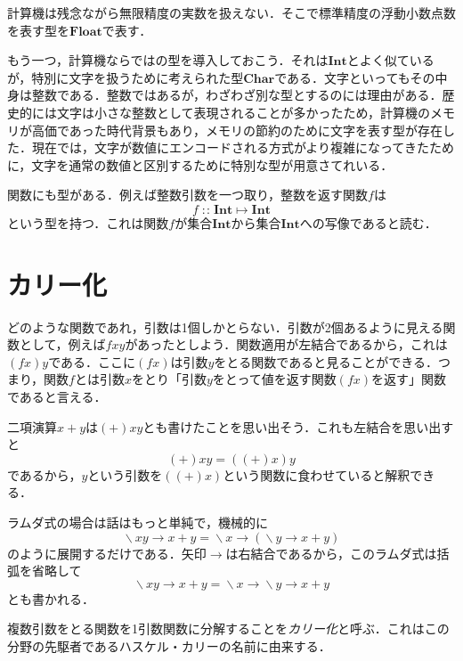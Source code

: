 \documentclass[twocolumn]{jsbook}
\newcommand{\keyword}[1]{{\emph{#1}}}
\newcommand{\hsklType}[1]{\textbf{#1}}
\newcommand{\hsklChar}{\hsklType{Char}}
\newcommand{\hsklInt}{\hsklType{Int}}
\newcommand{\hsklFloat}{\hsklType{Float}}
\DeclareMathOperator{\mathIn}{:\!:}
\DeclareMathOperator{\mathLambda}{\backslash}
\DeclareMathOperator{\mathMapsTo}{\mapsto}
\newcommand{\mathLambdaArrow}{\rightarrow}
\newcommand{\mathLambdaExpression}[2]{\mathLambda#1\mathLambdaArrow#2}
\newcommand{\mathMorph}[2]{#1\mathMapsTo#2}
\begin{document}
計算機は残念ながら無限精度の実数を扱えない．そこで標準精度の浮動小数点数を表す型を$\hsklFloat$で表す．

もう一つ，計算機ならではの型を導入しておこう．それは$\hsklInt$とよく似ているが，特別に文字を扱うために考えられた型$\hsklChar$である．文字といってもその中身は整数である．整数ではあるが，わざわざ別な型とするのには理由がある．歴史的には文字は小さな整数として表現されることが多かったため，計算機のメモリが高価であった時代背景もあり，メモリの節約のために文字を表す型が存在した．現在では，文字が数値にエンコードされる方式がより複雑になってきたために，文字を通常の数値と区別するために特別な型が用意さてれいる．

関数にも型がある．例えば整数引数を一つ取り，整数を返す関数$f$は
\begin{equation*}
f\mathIn\mathMorph{\hsklInt}{\hsklInt}
\end{equation*}
という型を持つ．これは関数$f$が集合$\hsklInt$から集合$\hsklInt$への写像であると読む．

\section{カリー化}

どのような関数であれ，引数は1個しかとらない．引数が2個あるように見える関数として，例えば$fxy$があったとしよう．関数適用が左結合であるから，これは$(fx)y$である．ここに$(fx)$は引数$y$をとる関数であると見ることができる．つまり，関数$f$とは引数$x$をとり「引数$y$をとって値を返す関数$(fx)$を返す」関数であると言える．

二項演算$x+y$は$(+)xy$とも書けたことを思い出そう．これも左結合を思い出すと
\begin{equation}
(+)xy=((+)x)y
\end{equation}
であるから，$y$という引数を$((+)x)$という関数に食わせていると解釈できる．

ラムダ式の場合は話はもっと単純で，機械的に
\begin{equation}
\mathLambdaExpression{xy}{x+y}=\mathLambdaExpression{x}{(\mathLambdaExpression{y}{x+y})}
\end{equation}
のように展開するだけである．矢印$\mathLambdaArrow$は右結合であるから，このラムダ式は括弧を省略して
\begin{equation}
\mathLambdaExpression{xy}{x+y}=\mathLambdaExpression{x}{\mathLambdaExpression{y}{x+y}}
\end{equation}
とも書かれる．

複数引数をとる関数を1引数関数に分解することを\keyword{カリー化}と呼ぶ．これはこの分野の先駆者であるハスケル・カリーの名前に由来する．
\end{document}
